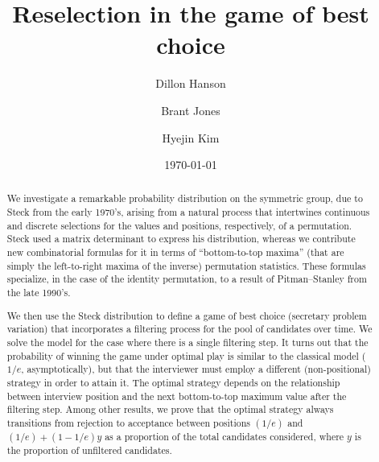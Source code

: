 \documentclass[11pt]{amsart}   %
\newcommand{\href}[2]{#2}
\newcommand{\url}[2]{#2}
\theoremstyle{definition}
\theoremstyle{remark}
\numberwithin{equation}{section}
\theoremstyle{theorem}
\begin{document}
\title{Reselection in the game of best choice}

\begin{abstract}
We investigate a remarkable probability distribution on the symmetric
group, due to Steck from the early 1970's, arising from a natural process that
intertwines continuous and discrete selections for the values and positions,
respectively, of a permutation.  Steck used a matrix determinant to express his
distribution, whereas we contribute new combinatorial formulas for it in terms
of ``bottom-to-top maxima'' (that are simply the left-to-right maxima of the
inverse) permutation statistics.  These formulas specialize, in the case of the
identity permutation, to a result of Pitman--Stanley from the late 1990's.

\medskip \noindent
We then use the Steck distribution to define a game of best choice (secretary
problem variation) that incorporates a filtering process for the pool of
candidates over time.  We solve the model for the case where there is a single
filtering step.  It turns out that the probability of winning the game under
optimal play is similar to the classical model ($1/e$, asymptotically), but
that the interviewer must employ a different (non-positional) strategy in order
to attain it.  The optimal strategy depends on the relationship between
interview position and the next bottom-to-top maximum value after the filtering
step.  Among other results, we prove that the optimal strategy always
transitions from rejection to acceptance between positions $(1/e)$ and $(1/e) +
(1 - 1/e)y$ as a proportion of the total candidates considered, where $y$ is
the proportion of unfiltered candidates.
\end{abstract}

\author{Dillon Hanson}
\address{Department of Mathematics, Jacksonville University,
Jacksonville, Florida 32211, USA}
\author[Brant Jones]{Brant Jones}
\address{Department of Mathematics and Statistics, MSC 1911, James Madison University, Harrisonburg, VA 22807}
\email{\href{mailto:jones3bc@jmu.edu}{\texttt{jones3bc@jmu.edu}}}
\author{Hyejin Kim} %
\address{Department of Mathematics and Statistics, University of Michigan--Dearborn, Dearborn, MI 48128, USA}

\date{\today}

\maketitle
\end{document}
